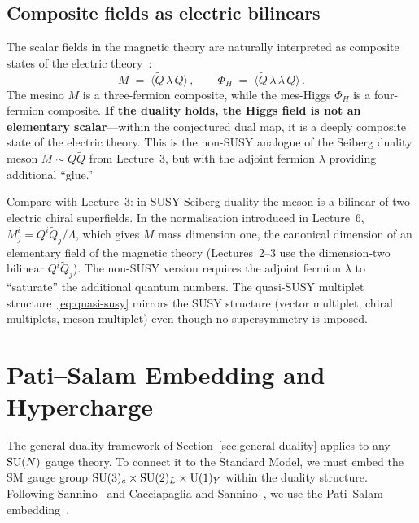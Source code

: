 \documentclass[11pt,a4paper]{article}
\begin{document}
\subsection{Composite fields as electric bilinears}

The scalar fields in the magnetic theory are naturally interpreted as
composite states of the electric theory~\cite{CacciapagliaSannino2024}:
\begin{equation}\label{eq:composites}
  M \;=\; \langle \widetilde{Q}\, \lambda\, Q \rangle\,,
  \qquad
  \Phi_H \;=\; \langle \widetilde{Q}\, \lambda\, \lambda\, Q \rangle\,.
\end{equation}
The mesino $M$ is a three-fermion composite, while the mes-Higgs
$\Phi_H$ is a four-fermion composite.  \textbf{If the duality holds, the Higgs field is not
an elementary scalar}---within the conjectured dual map, it is a deeply composite state of the electric
theory.  This is the non-SUSY analogue of the Seiberg duality meson
$M \sim Q\widetilde{Q}$ from Lecture~3, but with the adjoint fermion
$\lambda$ providing additional ``glue.''

\begin{remark}
  Compare with Lecture~3: in SUSY Seiberg duality the meson is a
  bilinear of two electric chiral superfields.  In the normalisation
  introduced in Lecture~6, $M^i_j = Q^i \widetilde{Q}_j / \Lambda$,
  which gives $M$ mass dimension one, the canonical dimension of an
  elementary field of the magnetic theory (Lectures~2--3 use the
  dimension-two bilinear $Q^i \widetilde{Q}_j$).
  The non-SUSY version requires the adjoint fermion $\lambda$ to
  ``saturate'' the additional quantum numbers.  The quasi-SUSY
  multiplet structure~\eqref{eq:quasi-susy} mirrors the SUSY
  structure (vector multiplet, chiral multiplets, meson multiplet)
  even though no supersymmetry is imposed.
\end{remark}


\section{Pati--Salam Embedding and Hypercharge}
\label{sec:pati-salam}

The general duality framework of Section~\ref{sec:general-duality}
applies to any $\mathrm{SU}(N)$ gauge theory.  To connect it to the Standard
Model, we must embed the SM gauge group
$\mathrm{SU}(3)_c \times \mathrm{SU}(2)_L \times \mathrm{U}(1)_Y$ within the duality
structure.  Following Sannino~\cite{Sannino2011} and Cacciapaglia and
Sannino~\cite{CacciapagliaSannino2024}, we use the Pati--Salam
embedding~\cite{PS1974}.
\end{document}
